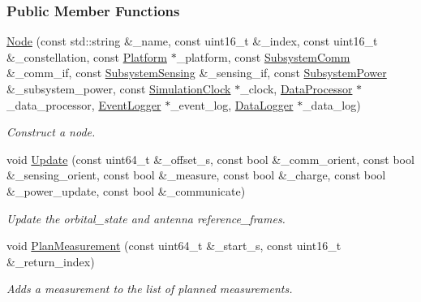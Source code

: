 \subsubsection*{Public Member Functions}
\begin{DoxyCompactItemize}
\item 
\hyperlink{classosse_1_1collaborate_1_1_node_ae2a5efe31854b5d48a5887eedfbdf741}{Node} (const std\+::string \&\+\_\+name, const uint16\+\_\+t \&\+\_\+index, const uint16\+\_\+t \&\+\_\+constellation, const \hyperlink{classosse_1_1collaborate_1_1_platform}{Platform} $\ast$\+\_\+platform, const \hyperlink{classosse_1_1collaborate_1_1_subsystem_comm}{Subsystem\+Comm} \&\+\_\+comm\+\_\+if, const \hyperlink{classosse_1_1collaborate_1_1_subsystem_sensing}{Subsystem\+Sensing} \&\+\_\+sensing\+\_\+if, const \hyperlink{classosse_1_1collaborate_1_1_subsystem_power}{Subsystem\+Power} \&\+\_\+subsystem\+\_\+power, const \hyperlink{classosse_1_1collaborate_1_1_simulation_clock}{Simulation\+Clock} $\ast$\+\_\+clock, \hyperlink{classosse_1_1collaborate_1_1_data_processor}{Data\+Processor} $\ast$\+\_\+data\+\_\+processor, \hyperlink{classosse_1_1collaborate_1_1_event_logger}{Event\+Logger} $\ast$\+\_\+event\+\_\+log, \hyperlink{classosse_1_1collaborate_1_1_data_logger}{Data\+Logger} $\ast$\+\_\+data\+\_\+log)
\begin{DoxyCompactList}\small\item\em Construct a node. \end{DoxyCompactList}\item 
void \hyperlink{classosse_1_1collaborate_1_1_node_acd3b3577f11a2e3a360c98f47cbfdc59}{Update} (const uint64\+\_\+t \&\+\_\+offset\+\_\+s, const bool \&\+\_\+comm\+\_\+orient, const bool \&\+\_\+sensing\+\_\+orient, const bool \&\+\_\+measure, const bool \&\+\_\+charge, const bool \&\+\_\+power\+\_\+update, const bool \&\+\_\+communicate)
\begin{DoxyCompactList}\small\item\em Update the orbital\+\_\+state and antenna reference\+\_\+frames. \end{DoxyCompactList}\item 
void \hyperlink{classosse_1_1collaborate_1_1_node_a39b4ab16083780371f5e4fa4acb406dc}{Plan\+Measurement} (const uint64\+\_\+t \&\+\_\+start\+\_\+s, const uint16\+\_\+t \&\+\_\+return\+\_\+index)
\begin{DoxyCompactList}\small\item\em Adds a measurement to the list of planned measurements. \end{DoxyCompactList}\item 

\end{DoxyCompactItemize}
